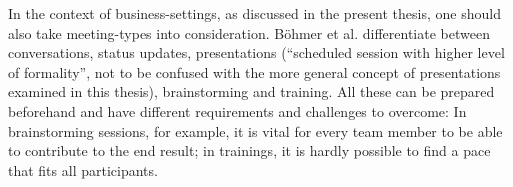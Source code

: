In the context of business-settings, as discussed in the present thesis, one should also take meeting-types into consideration. Böhmer et al. \cite{Bohmer:SmartphoneUseRude} differentiate between conversations, status updates, presentations (``scheduled session with higher level of formality'', not to be confused with the more general concept of presentations examined in this thesis), brainstorming and training. All these can be prepared beforehand and have different requirements and challenges to overcome: In brainstorming sessions, for example, it is vital for every team member to be able to contribute to the end result; in trainings, it is hardly possible to find a pace that fits all participants.

